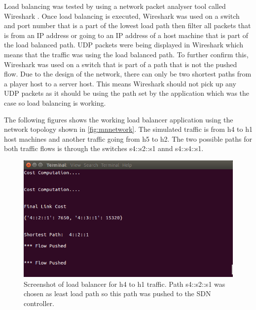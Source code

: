 \newline
\par
Load balancing was tested by using a network packet analyser tool called Wireshark \cite{wireshark}. Once load balancing is executed, Wireshark was used on a switch and port number that is a part of the lowest load path then filter all packets that is from an IP address or going to an IP address of a host machine that is part of the load balanced path. UDP packets were being displayed in Wireshark which means that the traffic was using the load balanced path. To further confirm this, Wireshark was used on a switch that is part of a path that is not the pushed flow. Due to the design of the network, there can only be two shortest paths from a player host to a server host. This means Wireshark should not pick up any UDP packets as it should be using the path set by the application which was the case so load balancing is working.
\newline
\par
The following figures shows the working load balancer application using the network topology shown in \ref{fig:mnnetwork}. The simulated traffic is from h4 to h1 host machines and another traffic going from h5 to h2. The two possible paths for both traffic flows is through the switches s4::s2::s1 annd s4::s4::s1.
\newline
\begin{figure}[h!]
 \centering
 \includegraphics[width=\linewidth]{images/loadbalancing/h1toh4.png}
 \caption{Screenshot of load balancer for h4 to h1 traffic. Path s4::s2::s1 was chosen as least load path so this path was pushed to the SDN controller.}
 \label{fig:h1toh4}
\end{figure}


